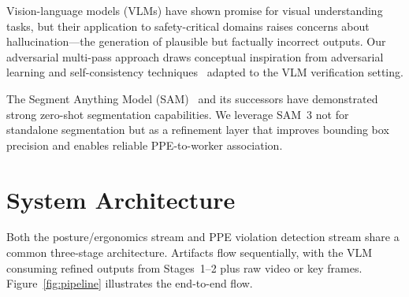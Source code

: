 \documentclass[11pt, twocolumn]{article}
\begin{document}
Vision-language models (VLMs) have shown promise for visual understanding tasks, but their application to safety-critical domains raises concerns about hallucination---the generation of plausible but factually incorrect outputs. Our adversarial multi-pass approach draws conceptual inspiration from adversarial learning and self-consistency techniques~\cite{wang2022} adapted to the VLM verification setting.

The Segment Anything Model (SAM)~\cite{kirillov2023} and its successors have demonstrated strong zero-shot segmentation capabilities. We leverage SAM~3 not for standalone segmentation but as a refinement layer that improves bounding box precision and enables reliable PPE-to-worker association.

\section{System Architecture}

Both the posture/ergonomics stream and PPE violation detection stream share a common three-stage architecture. Artifacts flow sequentially, with the VLM consuming refined outputs from Stages~1--2 plus raw video or key frames. Figure~\ref{fig:pipeline} illustrates the end-to-end flow.
\end{document}
